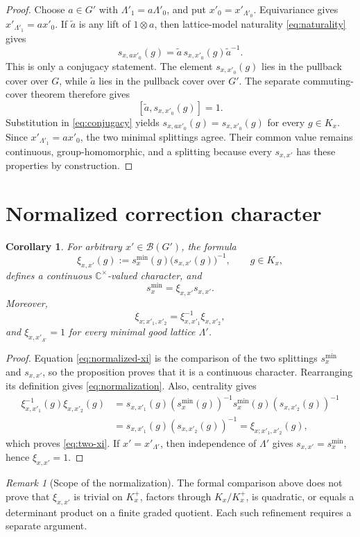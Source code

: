 \documentclass[11pt]{amsart}
\newtheorem{corollary}[theorem]{Corollary}
\theoremstyle{remark}
\newtheorem{remark}[theorem]{Remark}
\begin{document}
\begin{proof}
Choose $a\in G'$ with $\Lambda'_1=a\Lambda'_0$, and put
$x'_0=x'_{\Lambda'_0}$. Equivariance gives
$x'_{\Lambda'_1}=a x'_0$. If $\widetilde a$ is any lift of $1\otimes a$,
then lattice-model naturality \eqref{eq:naturality} gives
\begin{equation}
s_{x,a x'_0}(g)
=\widetilde a\,s_{x,x'_0}(g)\widetilde a^{-1}.
\label{eq:conjugacy}
\end{equation}
This is only a conjugacy statement. The element $s_{x,x'_0}(g)$ lies in the
pullback cover over $G$, while $\widetilde a$ lies in the pullback cover over
$G'$. The separate commuting-cover theorem therefore gives
\[
[\widetilde a,s_{x,x'_0}(g)]=1.
\]
Substitution in \eqref{eq:conjugacy} yields
$s_{x,a x'_0}(g)=s_{x,x'_0}(g)$ for every $g\in K_x$. Since
$x'_{\Lambda'_1}=a x'_0$, the two minimal splittings agree. Their common
value remains continuous, group-homomorphic, and a splitting because every
$s_{x,x'}$ has these properties by construction.
\end{proof}

\section{Normalized correction character}

\begin{corollary}
For arbitrary $x'\in\mathcal B(G')$, the formula
\begin{equation}
\boxed{\quad
\xi_{x,x'}(g)
:=s_x^{\min}(g)\bigl(s_{x,x'}(g)\bigr)^{-1},
\qquad g\in K_x,
\quad}
\label{eq:normalized-xi}
\end{equation}
defines a continuous $\mathbb C^\times$-valued character, and
\begin{equation}
\boxed{\quad s_x^{\min}=\xi_{x,x'}s_{x,x'}.\quad}
\label{eq:normalization}
\end{equation}
Moreover,
\begin{equation}
\xi_{x;x'_1,x'_2}
=\xi_{x,x'_1}^{-1}\xi_{x,x'_2},
\label{eq:two-xi}
\end{equation}
and $\xi_{x,x'_{\Lambda'}}=1$ for every minimal good lattice $\Lambda'$.
\end{corollary}

\begin{proof}
Equation \eqref{eq:normalized-xi} is the comparison of the two splittings
$s_x^{\min}$ and $s_{x,x'}$, so the proposition proves that it is a continuous
character. Rearranging its definition gives \eqref{eq:normalization}. Also,
centrality gives
\[
\begin{aligned}
\xi_{x,x'_1}^{-1}(g)\xi_{x,x'_2}(g)
 &=s_{x,x'_1}(g)(s_x^{\min}(g))^{-1}
   s_x^{\min}(g)(s_{x,x'_2}(g))^{-1}\\
 &=s_{x,x'_1}(g)(s_{x,x'_2}(g))^{-1}
  =\xi_{x;x'_1,x'_2}(g),
\end{aligned}
\]
which proves \eqref{eq:two-xi}. If $x'=x'_{\Lambda'}$, then independence of
$\Lambda'$ gives $s_{x,x'}=s_x^{\min}$, hence $\xi_{x,x'}=1$.
\end{proof}

\begin{remark}[Scope of the normalization]
The formal comparison above does not prove that $\xi_{x,x'}$ is trivial on
$K_x^+$, factors through $K_x/K_x^+$, is quadratic, or equals a determinant
product on a finite graded quotient. Each such refinement requires a separate
argument.
\end{remark}
\end{document}

